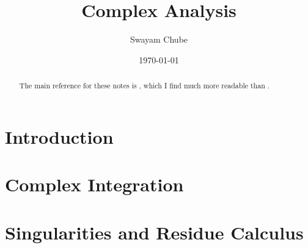 \documentclass{report}
\title{Complex Analysis}
\author{Swayam Chube}
\date{\today}
\begin{document}
\maketitle 

\begin{abstract}
    The main reference for these notes is \cite{conway}, which I find much more readable than \cite{ahlfors}.
\end{abstract}

\tableofcontents

\chapter{Introduction}


\chapter{Complex Integration}


\chapter{Singularities and Residue Calculus}




\end{document}
